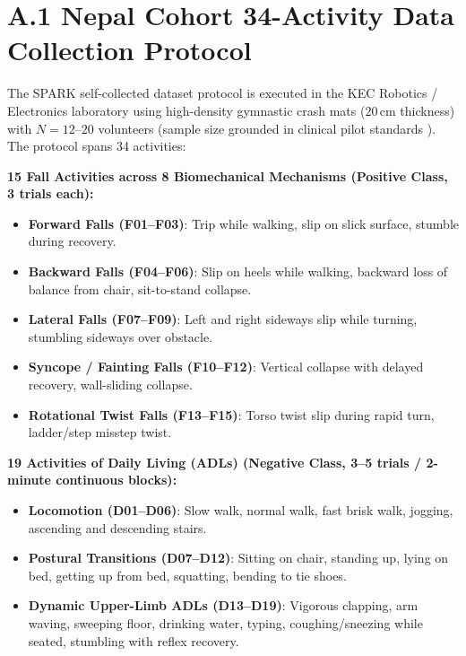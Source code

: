 
\section*{A.1 \quad Nepal Cohort 34-Activity Data Collection Protocol}

The SPARK self-collected dataset protocol is executed in the KEC Robotics / Electronics laboratory using high-density gymnastic crash mats ($20$\,cm thickness) with $N=12\text{--}20$ volunteers (sample size grounded in clinical pilot standards \cite{julious2005sample}). The protocol spans 34 activities:

\textbf{15 Fall Activities across 8 Biomechanical Mechanisms (Positive Class, 3 trials each):}
\begin{itemize}
    \item \textbf{Forward Falls (F01--F03)}: Trip while walking, slip on slick surface, stumble during recovery.
    \item \textbf{Backward Falls (F04--F06)}: Slip on heels while walking, backward loss of balance from chair, sit-to-stand collapse.
    \item \textbf{Lateral Falls (F07--F09)}: Left and right sideways slip while turning, stumbling sideways over obstacle.
    \item \textbf{Syncope / Fainting Falls (F10--F12)}: Vertical collapse with delayed recovery, wall-sliding collapse.
    \item \textbf{Rotational Twist Falls (F13--F15)}: Torso twist slip during rapid turn, ladder/step misstep twist.
\end{itemize}

\textbf{19 Activities of Daily Living (ADLs) (Negative Class, 3--5 trials / 2-minute continuous blocks):}
\begin{itemize}
    \item \textbf{Locomotion (D01--D06)}: Slow walk, normal walk, fast brisk walk, jogging, ascending and descending stairs.
    \item \textbf{Postural Transitions (D07--D12)}: Sitting on chair, standing up, lying on bed, getting up from bed, squatting, bending to tie shoes.
    \item \textbf{Dynamic Upper-Limb ADLs (D13--D19)}: Vigorous clapping, arm waving, sweeping floor, drinking water, typing, coughing/sneezing while seated, stumbling with reflex recovery.
\end{itemize}

